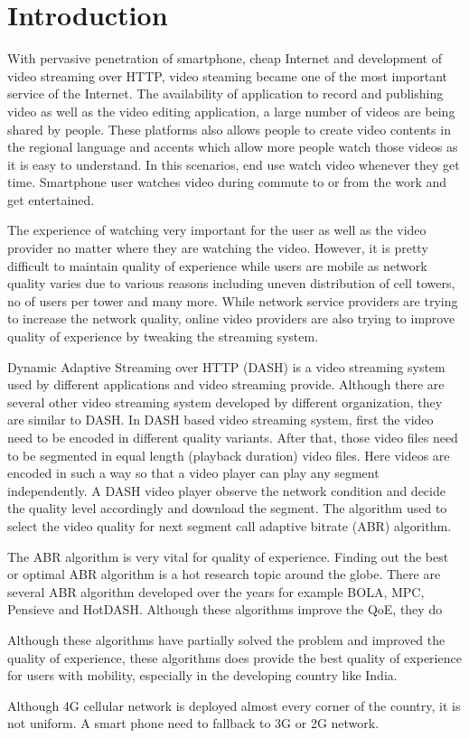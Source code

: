 \section{Introduction}
With pervasive penetration of smartphone, cheap Internet and development of video streaming over HTTP, video steaming became one of the most important service of the Internet. The availability of application to record and publishing video as well as the video editing application, a large number of videos are being shared by people. These platforms also allows people to create video contents in the regional language and accents which allow more people watch those videos as it is easy to understand. In this scenarios, end use watch video whenever they get time. Smartphone user watches video during commute to or from the work and get entertained.

The experience of watching very important for the user as well as the video provider no matter where they are watching the video. However, it is pretty difficult to maintain quality of experience while users are mobile as network quality varies due to various reasons including uneven distribution of cell towers, no of users per tower and many more. While network service providers are trying to increase the network quality, online video providers are also trying to improve quality of experience by tweaking the streaming system.

Dynamic Adaptive Streaming over HTTP (DASH) is a video streaming system used by different applications and video streaming provide. Although there are several other video streaming system developed by different organization, they are similar to DASH. In DASH based video streaming system, first the video need to be encoded in different quality variants. After that, those video files need to be segmented in equal length (playback duration) video files. Here videos are encoded in such a way so that a video player can play any segment independently. A DASH video player observe the network condition and decide the quality level accordingly and download the segment. The algorithm used to select the video quality for next segment call adaptive bitrate (ABR) algorithm.

The ABR algorithm is very vital for quality of experience. Finding out the best or optimal ABR algorithm is a hot research topic around the globe. There are several ABR algorithm developed over the years for example BOLA, MPC, Pensieve and HotDASH. Although these algorithms improve the QoE, they do

Although these algorithms have partially solved the problem and improved the quality of experience, these algorithms does provide the best quality of experience for users with mobility, especially in the developing country like India.

Although 4G cellular network is deployed almost every corner of the country, it is not uniform. A smart phone need to fallback to 3G or 2G network. 

